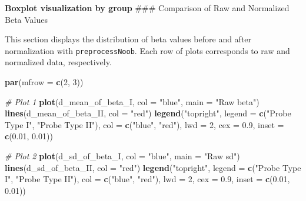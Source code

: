 \documentclass[
  11pt,
]{article}
\newenvironment{Shaded}{\begin{snugshade}}{\end{snugshade}}
\newcommand{\AttributeTok}[1]{\textcolor[rgb]{0.13,0.29,0.53}{#1}}
\newcommand{\CommentTok}[1]{\textcolor[rgb]{0.56,0.35,0.01}{\textit{#1}}}
\newcommand{\DecValTok}[1]{\textcolor[rgb]{0.00,0.00,0.81}{#1}}
\newcommand{\FloatTok}[1]{\textcolor[rgb]{0.00,0.00,0.81}{#1}}
\newcommand{\FunctionTok}[1]{\textcolor[rgb]{0.13,0.29,0.53}{\textbf{#1}}}
\newcommand{\NormalTok}[1]{#1}
\newcommand{\StringTok}[1]{\textcolor[rgb]{0.31,0.60,0.02}{#1}}
\begin{document}
\textbf{Boxplot visualization by group} \#\#\# Comparison of Raw and
Normalized Beta Values

This section displays the distribution of beta values before and after
normalization with \texttt{preprocessNoob}. Each row of plots
corresponds to raw and normalized data, respectively.

\begin{Shaded}
\begin{Highlighting}[]
\FunctionTok{par}\NormalTok{(}\AttributeTok{mfrow =} \FunctionTok{c}\NormalTok{(}\DecValTok{2}\NormalTok{, }\DecValTok{3}\NormalTok{))}

\CommentTok{\# Plot 1}
\FunctionTok{plot}\NormalTok{(d\_mean\_of\_beta\_I, }\AttributeTok{col =} \StringTok{"blue"}\NormalTok{, }\AttributeTok{main =} \StringTok{"Raw beta"}\NormalTok{)}
\FunctionTok{lines}\NormalTok{(d\_mean\_of\_beta\_II, }\AttributeTok{col =} \StringTok{"red"}\NormalTok{)}
\FunctionTok{legend}\NormalTok{(}\StringTok{"topright"}\NormalTok{,}
       \AttributeTok{legend =} \FunctionTok{c}\NormalTok{(}\StringTok{"Probe Type I"}\NormalTok{, }\StringTok{"Probe Type II"}\NormalTok{),}
       \AttributeTok{col =} \FunctionTok{c}\NormalTok{(}\StringTok{"blue"}\NormalTok{, }\StringTok{"red"}\NormalTok{),}
       \AttributeTok{lwd =} \DecValTok{2}\NormalTok{,}
       \AttributeTok{cex =} \FloatTok{0.9}\NormalTok{,}
       \AttributeTok{inset =} \FunctionTok{c}\NormalTok{(}\FloatTok{0.01}\NormalTok{, }\FloatTok{0.01}\NormalTok{))}

\CommentTok{\# Plot 2}
\FunctionTok{plot}\NormalTok{(d\_sd\_of\_beta\_I, }\AttributeTok{col =} \StringTok{"blue"}\NormalTok{, }\AttributeTok{main =} \StringTok{"Raw sd"}\NormalTok{)}
\FunctionTok{lines}\NormalTok{(d\_sd\_of\_beta\_II, }\AttributeTok{col =} \StringTok{"red"}\NormalTok{)}
\FunctionTok{legend}\NormalTok{(}\StringTok{"topright"}\NormalTok{,}
       \AttributeTok{legend =} \FunctionTok{c}\NormalTok{(}\StringTok{"Probe Type I"}\NormalTok{, }\StringTok{"Probe Type II"}\NormalTok{),}
       \AttributeTok{col =} \FunctionTok{c}\NormalTok{(}\StringTok{"blue"}\NormalTok{, }\StringTok{"red"}\NormalTok{),}
       \AttributeTok{lwd =} \DecValTok{2}\NormalTok{,}
       \AttributeTok{cex =} \FloatTok{0.9}\NormalTok{,}
       \AttributeTok{inset =} \FunctionTok{c}\NormalTok{(}\FloatTok{0.01}\NormalTok{, }\FloatTok{0.01}\NormalTok{))}


\end{Highlighting}
\end{Shaded}
\end{document}
